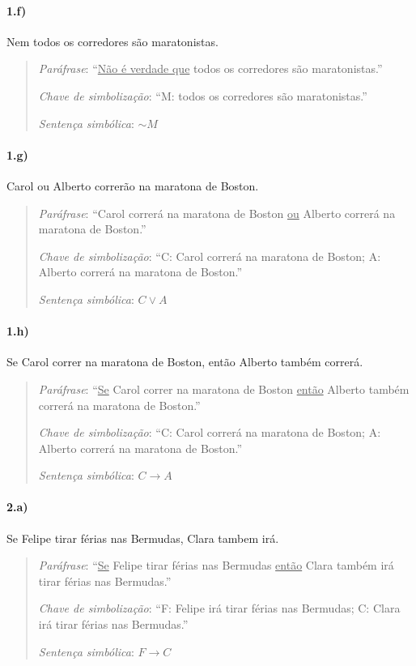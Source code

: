 \documentclass[pdftex,a4paper,12pt,brazil]{article} %
\begin{document}
\paragraph{1.f)} Nem todos os corredores são maratonistas.

\begin{quote}
  \emph{Paráfrase}: ``\underline{Não é verdade que} todos os corredores são maratonistas.''

  \emph{Chave de simbolização}: ``M: todos os corredores são maratonistas.''

  \emph{Sentença simbólica}: $\sim M$
\end{quote}

\paragraph{1.g)} Carol ou Alberto correrão na maratona de Boston.

\begin{quote}
  \emph{Paráfrase}: ``Carol correrá na maratona de Boston \underline{ou} Alberto correrá na maratona de Boston.''

  \emph{Chave de simbolização}: ``C: Carol correrá na maratona de Boston; A: Alberto correrá na maratona de Boston.''

  \emph{Sentença simbólica}: $C \vee A$
\end{quote}

\paragraph{1.h)} Se Carol correr na maratona de Boston, então Alberto também correrá.

\begin{quote}
  \emph{Paráfrase}: ``\underline{Se} Carol correr na maratona de Boston \underline{então} Alberto também correrá na maratona de Boston.''

  \emph{Chave de simbolização}: ``C: Carol correrá na maratona de Boston; A: Alberto correrá na maratona de Boston.''

  \emph{Sentença simbólica}: $C \rightarrow A$
\end{quote}

\paragraph{2.a)} Se Felipe tirar férias nas Bermudas, Clara tambem irá.

\begin{quote}
  \emph{Paráfrase}: ``\underline{Se} Felipe tirar férias nas Bermudas \underline{então} Clara também irá tirar férias nas Bermudas.''

  \emph{Chave de simbolização}: ``F: Felipe irá tirar férias nas Bermudas; C: Clara irá tirar férias nas Bermudas.''

  \emph{Sentença simbólica}: $F \rightarrow C$
\end{quote}
\end{document}
